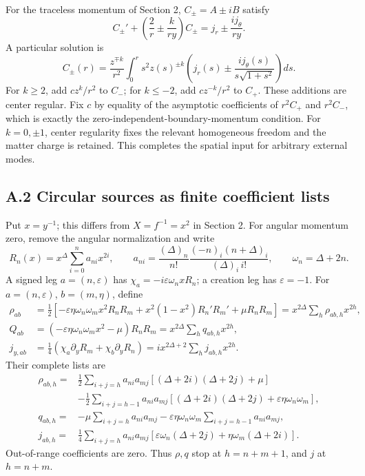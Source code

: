 For the traceless momentum of Section 2, \(C_\pm=A\pm iB\) satisfy \[
C_\pm'+\left(\frac2r\pm\frac{k}{ry}\right)C_\pm
=j_r\pm\frac{ij_\theta}{ry}.
\tag{A.6}
\] A particular solution is \[
C_\pm(r)=\frac{z^{\mp k}}{r^2}
\int_0^r s^2z(s)^{\pm k}
\left(j_r(s)\pm\frac{ij_\theta(s)}{s\sqrt{1+s^2}}\right)ds .
\tag{A.7}
\] For \(k\ge2\), add \(cz^k/r^2\) to \(C_-\); for \(k\le-2\), add \(cz^{-k}/r^2\) to \(C_+\). These additions are center regular. Fix \(c\) by equality of the asymptotic coefficients of \(r^2C_+\) and \(r^2C_-\), which is exactly the zero-independent-boundary-momentum condition. For \(k=0,\pm1\), center regularity fixes the relevant homogeneous freedom and the matter charge is retained. This completes the spatial input for arbitrary external modes.

\hypertarget{a.2-circular-sources-as-finite-coefficient-lists}{%
\subsection{A.2 Circular sources as finite coefficient lists}\label{a.2-circular-sources-as-finite-coefficient-lists}}

Put \(x=y^{-1}\); this differs from \(X=f^{-1}=x^2\) in Section 2. For angular momentum zero, remove the angular normalization and write \[
R_n(x)=x^\Delta\sum_{i=0}^n a_{ni}x^{2i},\qquad
a_{ni}=\frac{(\Delta)_n}{n!}
\frac{(-n)_i(n+\Delta)_i}{(\Delta)_i\,i!},
\qquad \omega_n=\Delta+2n.
\tag{A.8}
\] A signed leg \(a=(n,\varepsilon)\) has \(\chi_a=-i\varepsilon\omega_nxR_n\); a creation leg has \(\varepsilon=-1\). For \(a=(n,\varepsilon)\), \(b=(m,\eta)\), define \[
\begin{aligned}
\rho_{ab}&=\frac12\left[
-\varepsilon\eta\omega_n\omega_mx^2R_nR_m
+x^2(1-x^2)R_n'R_m'+\mu R_nR_m\right]
=x^{2\Delta}\sum_h\rho_{ab,h}x^{2h},\\
Q_{ab}&=(-\varepsilon\eta\omega_n\omega_mx^2-\mu)R_nR_m
=x^{2\Delta}\sum_hq_{ab,h}x^{2h},\\
j_{y,ab}&=\frac14(\chi_a\partial_yR_m+\chi_b\partial_yR_n)
=ix^{2\Delta+2}\sum_hj_{ab,h}x^{2h}.
\end{aligned}
\tag{A.9}
\] Their complete lists are \[
\begin{aligned}
\rho_{ab,h}={}&\frac12\sum_{i+j=h}a_{ni}a_{mj}
[(\Delta+2i)(\Delta+2j)+\mu]\\
&-\frac12\sum_{i+j=h-1}a_{ni}a_{mj}
[(\Delta+2i)(\Delta+2j)+\varepsilon\eta\omega_n\omega_m],\\
q_{ab,h}={}&-\mu\sum_{i+j=h}a_{ni}a_{mj}
-\varepsilon\eta\omega_n\omega_m\sum_{i+j=h-1}a_{ni}a_{mj},\\
j_{ab,h}={}&\frac14\sum_{i+j=h}a_{ni}a_{mj}
[\varepsilon\omega_n(\Delta+2j)+\eta\omega_m(\Delta+2i)] .
\end{aligned}
\tag{A.10}
\] Out-of-range coefficients are zero. Thus \(\rho,q\) stop at \(h=n+m+1\), and \(j\) at \(h=n+m\).

